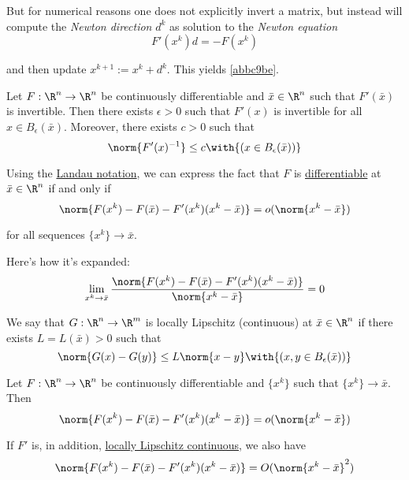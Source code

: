 But for numerical reasons one does not explicitly invert a matrix, but instead
will compute the \textit{Newton direction} $d^k$ as solution to the
\textit{Newton equation}
$$
  F'(x^k)d=-F(x^k)
$$

and then update $x^{k+1}:=x^k+d^k$. This yields \autoref{abbc9be}.

\label{ad66265}

Let $F:\R^n\to\R^n$ be continuously differentiable and $\bar x\in\R^n$ such
that $F'(\bar x)$ is invertible. Then there exists $\epsilon>0$ such that
$F'(x)$ is invertible for all $x\in B_\epsilon(\bar x)$. Moreover, there exists
$c>0$ such that
$$
  \norm{F'(x)^{-1}}\leq c\with{(x\in B_\epsilon(\bar x))}
$$


\label{b4ee31d}

Using the \href{ab54b3a}{Landau notation}, we can express the fact that $F$ is
\href{c62315d}{differentiable} at $\bar x\in\R^n$ if and only if
$$
  \norm{F(x^k)-F(\bar x)-F'(x^k)(x^k-\bar x)}=o(\norm{x^{k}-\bar x})
$$

for all sequences $\{x^k\}\to\bar x$.

Here's how it's expanded:
$$
  \lim_{x^k\to\bar x}\frac{\norm{F(x^k)-F(\bar x)-F'(x^k)(x^k-\bar x)}}{\norm{x^k-\bar x}}=0
$$

\label{ba65fa0}

We say that $G:\R^n\to\R^m$ is locally Lipschitz (continuous) at $\bar
x\in\R^n$ if there exists $L=L(\bar x)>0$ such that
$$
  \norm{G(x)-G(y)}\leq L\norm{x-y}\with{(x,y\in B_\epsilon(\bar x))}
$$

\Lemma{}\label{a71a60e}

Let $F:\R^n\to\R^n$ be continuously differentiable and $\{x^k\}$ such that
$\{x^k\}\to\bar x$. Then
\begin{equation*}
  \norm{F(x^k)-F(\bar x)-F'(x^k)(x^k-\bar x)}=o(\norm{x^{k}-\bar x})
\end{equation*}

If $F'$ is, in addition, \href{ba65fa0}{locally Lipschitz continuous}, we also
have
\begin{equation*}
  \norm{F(x^k)-F(\bar x)-F'(x^k)(x^k-\bar x)}=O(\norm{x^{k}-\bar x}^2)
\end{equation*}

